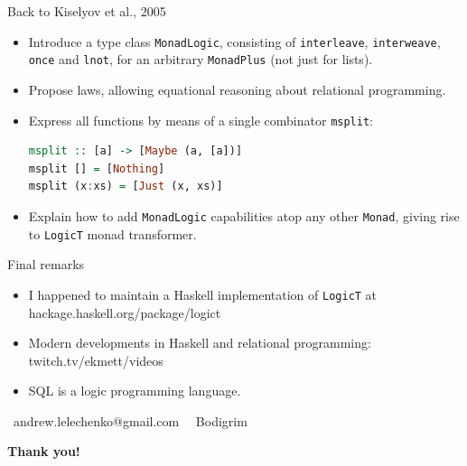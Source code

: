 \documentclass[handout]{beamer}
\begin{document}
\begin{frame}[fragile]{Back to Kiselyov et al., 2005}

\begin{itemize}[<+->]
\item Introduce a type class {\tt MonadLogic}, consisting of
      {\tt interleave}, {\tt interweave}, {\tt once} and {\tt lnot},
      for an arbitrary {\tt MonadPlus} (not just for lists).
\item Propose laws, allowing equational reasoning
      about relational programming.
\item Express all functions by means of a single combinator {\tt msplit}:
\begin{lstlisting}[language=Haskell]
msplit :: [a] -> [Maybe (a, [a])]
msplit [] = [Nothing]
msplit (x:xs) = [Just (x, xs)]
\end{lstlisting}

\item Explain how to add {\tt MonadLogic} capabilities atop any other {\tt Monad},
      giving rise to {\tt LogicT} monad transformer.

\end{itemize}

\end{frame}

\begin{frame}{Final remarks}

\begin{itemize}[<+->]
\item I happened to maintain a Haskell implementation of {\tt LogicT}
      at hackage.haskell.org/package/logict
\item Modern developments in Haskell and relational programming:
      twitch.tv/ekmett/videos
\item SQL is a logic programming language.
\end{itemize}

\bigskip
\bigskip
\bigskip

\par \faAt\ andrew.lelechenko@gmail.com
\hspace{7.5em}
\faGithub\ \faTelegram\ Bodigrim

\bigskip
\bigskip
\bigskip

\centerline{\Huge\bf Thank you!}
\end{frame}
\end{document}
